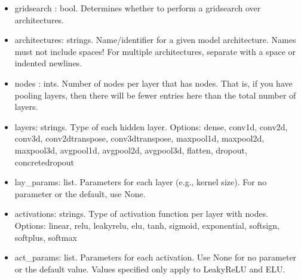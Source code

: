 \documentclass[letterpaper, 12pt]{article}
\begin{document}
\begin{itemize}
\item gridsearch : bool. Determines whether to perform a gridsearch over 
                         architectures.
\item architectures: strings. Name/identifier for a given model architecture.  
                         Names must not include spaces!
                         For multiple architectures, separate with a space or 
                         indented newlines.
\item nodes : ints. Number of nodes per layer that has nodes.  That is, if you 
                       have pooling layers, then there will be fewer entries here than 
                       the total number of layers.
\item layers: strings. Type of each hidden layer.  
                       Options: dense, conv1d, conv2d, conv3d, conv2dtranspose, 
                                conv3dtranspose, maxpool1d, maxpool2d, maxpool3d, 
                                avgpool1d, avgpool2d, avgpool3d, flatten, 
                                dropout, concretedropout
\item lay\_params: list. Parameters for each layer (e.g., kernel size). 
                        For no parameter or the default, use None.
\item activations: strings. Type of activation function per layer with nodes.
                        Options: linear, relu, leakyrelu, elu, tanh, sigmoid, 
                                 exponential, softsign, softplus, softmax
\item act\_params: list. Parameters for each activation.  
                        Use None for no parameter or the default value.
                        Values specified only apply to LeakyReLU and ELU.


\end{itemize}
\end{document}
